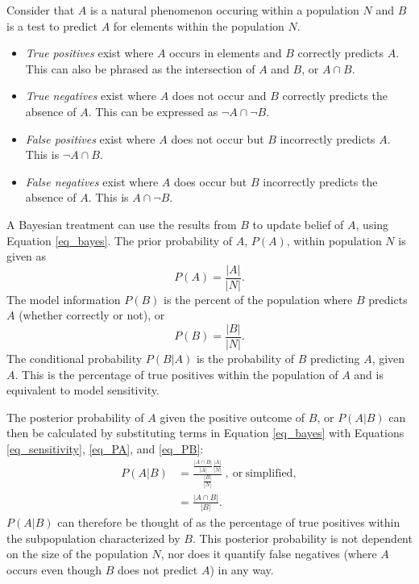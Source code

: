 \documentclass[12pt,letter]{article}
\begin{document}
		Consider that $A$ is a natural phenomenon occuring within a population $N$ and $B$ is a test to predict $A$ for elements within the population $N$. 
		\begin{itemize}
		\item \textit{True positives} exist where $A$ occurs in elements and $B$ correctly predicts $A$. This can also be phrased as the intersection of $A$ and $B$, or $A\cap B$.
		\item \textit{True negatives} exist where $A$ does not occur and $B$ correctly predicts the absence of $A$. This can be expressed as $\neg A\cap\neg B$.
		\item \textit{False positives} exist where $A$ does not occur but $B$ incorrectly predicts $A$. This is $\neg A\cap B$.
		\item \textit{False negatives} exist where $A$ does occur but $B$ incorrectly predicts the absence of $A$. This is $A\cap\neg B$.
		\end{itemize}

		A Bayesian treatment can use the results from $B$ to update belief of $A$, using Equation \ref{eq_bayes}. The prior probability of $A$, $P(A)$, within population $N$ is given as
		\begin{equation}
		P(A)=\frac{|A|}{|N|}.\label{eq_PA}
		\end{equation}
		The model information $P(B)$ is the percent of the population where $B$ predicts $A$ (whether correctly or not), or 
		\begin{equation}
		P(B)=\frac{|B|}{|N|}.\label{eq_PB}
		\end{equation}
		The conditional probability $P(B|A)$ is the probability of $B$ predicting $A$, given $A$. This is the percentage of true positives within the population of $A$ and is equivalent to model sensitivity.

		The posterior probability of $A$ given the positive outcome of $B$, or $P(A|B)$ can then be calculated by substituting terms in Equation \ref{eq_bayes} with Equations \ref{eq_sensitivity}, \ref{eq_PA}, and \ref{eq_PB}:
		\begin{align}
		P(A|B)&=\frac{\frac{|A\cap B|}{|A|}\frac{|A|}{|N|}}{\frac{|B|}{|N|}}~\mathrm{,~or~simplified,}\label{eq_unsimplepost}\\
		&=\frac{|A\cap B|}{|B|}.\label{eq_simplepost}
		\end{align}
		$P(A|B)$ can therefore be thought of as the percentage of true positives within the subpopulation characterized by $B$. This posterior probability is not dependent on the size of the population $N$, nor does it quantify false negatives (where $A$ occurs even though $B$ does not predict $A$) in any way.
\end{document}
